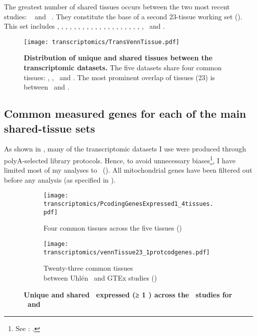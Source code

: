 The greatest number of shared tissues occurs
between the two most recent studies:
\uhlen~ and \gtex~.
They constitute the base of a second 23-tissue working set (\setTwo).
This set includes
\Adipose, \Adrenal, \Bladder, \Cortex, \hcolon, \Esophagus,
\Fallopian, \heart, \kidney, \liver, \lung, \Ovary, \Pancreas, \Prostate,
\salivary, \skeletal, \skin, \intestine, \spleen, \stomach, \testis,
\thyroid\ and \uterus.\mybr\

\begin{figure}[!htbp]
\texttt{[image: transcriptomics/TransVennTissue.pdf]}\centering
\caption[Distribution of unique and shared tissues between the
transcriptomic datasets]
{\label{fig:VennStudiesT}\textbf{Distribution of unique and shared tissues
between the transcriptomic datasets.} The five datasets share four
common tissues: \heart, \kidney, \liver\ and \testis.
The most prominent overlap of tissues (23) is between \uhlen\ and \gtex.
}
\end{figure}
\vspace*{-5mm}

\subsection{Common measured genes for each of the main shared-tissue sets\quad}%
\label{subsec:transGeneOverlap}
\vspace*{-9mm}
As shown in ,
many of the transcriptomic datasets I use were produced through
polyA-selected library protocols.
Hence,
to avoid unnecessary biases\footnote{See
: .},
I have limited most of my analyses to \pcgs\ ().
All mitochondrial genes have been filtered out before any \treps{} analysis
(as specified in ).\mybr\

\begin{figure}[!hptb]
    \centering
    \begin{subfigure}[b]{\textwidth}
        \centering \texttt{[image: transcriptomics/PcodingGenesExpressed1\_4tissues.pdf]}
        \caption{Four common tissues across the five tissues (\setOne)}\label{fig:ExpGenePcoding1}
    \end{subfigure}

    \begin{subfigure}[b]{\textwidth}
        \centering \texttt{[image: transcriptomics/vennTissue23\_1protcodgenes.pdf]}
        \caption{Twenty-three common tissues\\ between Uhlén \etal\
        and GTEx studies (\setTwo)}\label{fig:ExpGenePcoding1_t23}
    \end{subfigure}
    \caption[Unique and shared \pcgs\ expressed (≥1 \FPKM) across RNA-Seq studies]%
    {\textbf{Unique and shared \pcgs\ expressed (≥ 1 \FPKM) across the \Rnaseq\ studies
    for \setOne\ and \setTwo}}
\end{figure}

